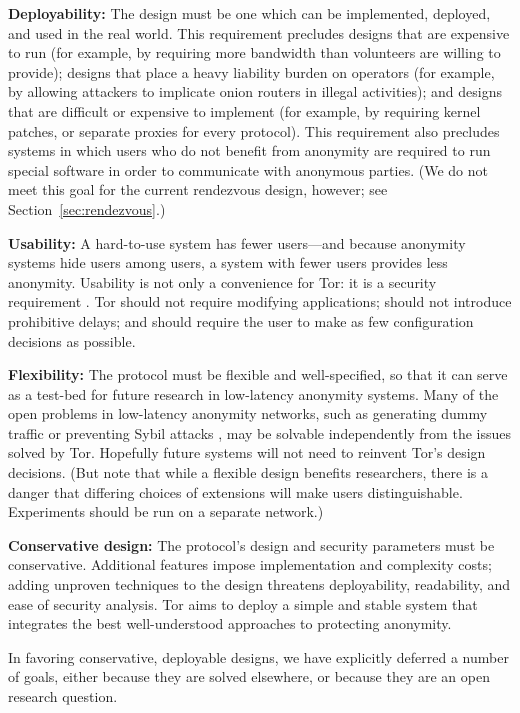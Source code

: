 \documentclass[times,10pt,twocolumn]{article}
\begin{document}
\textbf{Deployability:} The design must be one which can be implemented,
deployed, and used in the real world.  This requirement precludes designs
that are expensive to run (for example, by requiring more bandwidth
than volunteers are willing to provide); designs that place a heavy
liability burden on operators (for example, by allowing attackers to
implicate onion routers in illegal activities); and designs that are
difficult or expensive to implement (for example, by requiring kernel
patches, or separate proxies for every protocol).  This requirement also
precludes systems in which users who do not benefit from anonymity are
required to run special software in order to communicate with anonymous
parties. (We do not meet this goal for the current rendezvous design,
however; see Section~\ref{sec:rendezvous}.)

\textbf{Usability:} A hard-to-use system has fewer users---and because
anonymity systems hide users among users, a system with fewer users
provides less anonymity.  Usability is not only a convenience for Tor:
it is a security requirement \cite{econymics,back01}. Tor should not
require modifying applications; should not introduce prohibitive delays;
and should require the user to make as few configuration decisions
as possible.

\textbf{Flexibility:} The protocol must be flexible and well-specified,
so that it can serve as a test-bed for future research in low-latency
anonymity systems.  Many of the open problems in low-latency anonymity
networks, such as generating dummy traffic or preventing Sybil attacks
\cite{sybil}, may be solvable independently from the issues solved by
Tor. Hopefully future systems will not need to reinvent Tor's design
decisions.  (But note that while a flexible design benefits researchers,
there is a danger that differing choices of extensions will make users
distinguishable. Experiments should be run on a separate network.)

\textbf{Conservative design:} The protocol's design and security
parameters must be conservative. Additional features impose implementation
and complexity costs; adding unproven techniques to the design threatens
deployability, readability, and ease of security analysis. Tor aims to
deploy a simple and stable system that integrates the best well-understood
approaches to protecting anonymity.

\label{subsec:non-goals}
In favoring conservative, deployable designs, we have explicitly deferred
a number of goals, either because they are solved elsewhere, or because
they are an open research question.
\end{document}
